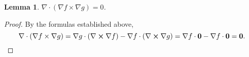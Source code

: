 \documentclass[11pt]{article}
\newtheorem*{lemma*}{Lemma}
\renewcommand{\vec}[1]{\mathbf{#1}}
\renewcommand{\div}{\nabla \cdot}
\renewcommand{\curl}{\nabla \cross}
\renewcommand{\grad}{\nabla}
\begin{document}
\begin{lemma*}
	$\div (\grad f \times \grad g) = 0$.
\end{lemma*}
\begin{adjustwidth}{0.7cm}{}
    \begin{proof}\renewcommand{\qedsymbol}{}
		By the formulas established above,
		\[
			\div (\grad f \times \grad g) = \grad g \cdot (\curl \grad f) - \grad f \cdot (\curl \grad g) = \grad f \cdot \vec{0} - \grad f \cdot \vec{0} = \vec{0}.
		\]
	\end{proof}
\end{adjustwidth}

\end{document}
